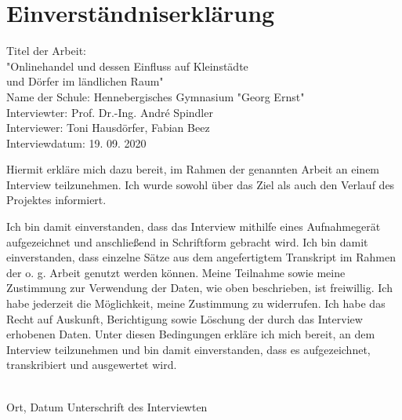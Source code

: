 \vspace*{4cm}
\section*{Einverständniserklärung}
\vfill\raggedright
Titel der Arbeit:\\ 
\raggedleft\vspace*{-0.63cm} "Onlinehandel und dessen Einfluss auf Kleinstädte\\
und Dörfer im ländlichen Raum"\\
Name der Schule: \hfill Hennebergisches Gymnasium "Georg Ernst"\\
Interviewter: \hfill Prof. Dr.-Ing. André Spindler\\
Interviewer: \hfill Toni Hausdörfer, Fabian Beez\\
Interviewdatum: \hfill 19. 09. 2020\\
\vfill\raggedright
Hiermit erkläre mich dazu bereit, im Rahmen der genannten Arbeit  an einem Interview teilzunehmen. Ich wurde sowohl über das Ziel als auch den Verlauf des Projektes informiert.

Ich bin damit einverstanden, dass das Interview mithilfe eines Aufnahmegerät aufgezeichnet und anschließend in Schriftform gebracht wird. Ich bin damit einverstanden, dass einzelne Sätze aus dem angefertigtem Transkript im Rahmen der o. g. Arbeit genutzt werden können. Meine Teilnahme sowie meine Zustimmung zur Verwendung der Daten, wie oben beschrieben, ist freiwillig. Ich habe jederzeit die Möglichkeit, meine Zustimmung zu widerrufen. Ich habe das Recht auf Auskunft, Berichtigung sowie Löschung der durch das Interview erhobenen Daten. Unter diesen Bedingungen erkläre ich mich bereit, an dem Interview teilzunehmen und bin damit einverstanden, dass es aufgezeichnet, transkribiert und ausgewertet wird.

\vfill
\noindent\dotfill\\
Ort, Datum \hfill Unterschrift des Interviewten
\vfill
\vfill
\newpage
